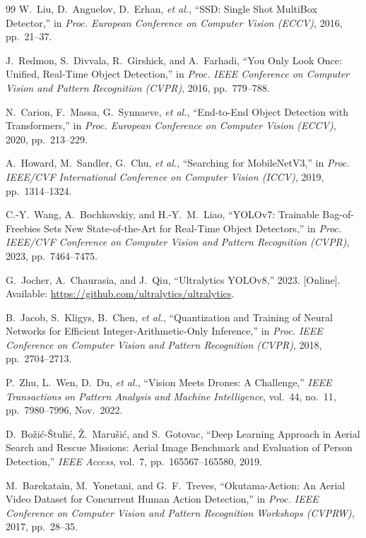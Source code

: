 \documentclass[journal]{IEEEtran}
\begin{document}
\begin{thebibliography}{99}
 W.~Liu, D.~Anguelov, D.~Erhan, \textit{et al.}, ``SSD: Single Shot MultiBox Detector,'' in \textit{Proc. European Conference on Computer Vision (ECCV)}, 2016, pp.~21--37.

 J.~Redmon, S.~Divvala, R.~Girshick, and A.~Farhadi, ``You Only Look Once: Unified, Real-Time Object Detection,'' in \textit{Proc. IEEE Conference on Computer Vision and Pattern Recognition (CVPR)}, 2016, pp.~779--788.

 N.~Carion, F.~Massa, G.~Synnaeve, \textit{et al.}, ``End-to-End Object Detection with Transformers,'' in \textit{Proc. European Conference on Computer Vision (ECCV)}, 2020, pp.~213--229.

 A.~Howard, M.~Sandler, G.~Chu, \textit{et al.}, ``Searching for MobileNetV3,'' in \textit{Proc. IEEE/CVF International Conference on Computer Vision (ICCV)}, 2019, pp.~1314--1324.

 C.-Y.~Wang, A.~Bochkovskiy, and H.-Y.~M.~Liao, ``YOLOv7: Trainable Bag-of-Freebies Sets New State-of-the-Art for Real-Time Object Detectors,'' in \textit{Proc. IEEE/CVF Conference on Computer Vision and Pattern Recognition (CVPR)}, 2023, pp.~7464--7475.

 G.~Jocher, A.~Chaurasia, and J.~Qiu, ``Ultralytics YOLOv8,'' 2023. [Online]. Available: \url{https://github.com/ultralytics/ultralytics}.

 B.~Jacob, S.~Kligys, B.~Chen, \textit{et al.}, ``Quantization and Training of Neural Networks for Efficient Integer-Arithmetic-Only Inference,'' in \textit{Proc. IEEE Conference on Computer Vision and Pattern Recognition (CVPR)}, 2018, pp.~2704--2713.

 P.~Zhu, L.~Wen, D.~Du, \textit{et al.}, ``Vision Meets Drones: A Challenge,'' \textit{IEEE Transactions on Pattern Analysis and Machine Intelligence}, vol.~44, no.~11, pp.~7980--7996, Nov.~2022.

 D.~Bo\v{z}i\'{c}-Štuli\'{c}, Ž.~Maruši\'{c}, and S.~Gotovac, ``Deep Learning Approach in Aerial Search and Rescue Missions: Aerial Image Benchmark and Evaluation of Person Detection,'' \textit{IEEE Access}, vol.~7, pp.~165567--165580, 2019.

 M.~Barekatain, M.~Yonetani, and G.~F.~Treves, ``Okutama-Action: An Aerial Video Dataset for Concurrent Human Action Detection,'' in \textit{Proc. IEEE Conference on Computer Vision and Pattern Recognition Workshops (CVPRW)}, 2017, pp.~28--35.


\end{thebibliography}
\end{document}
